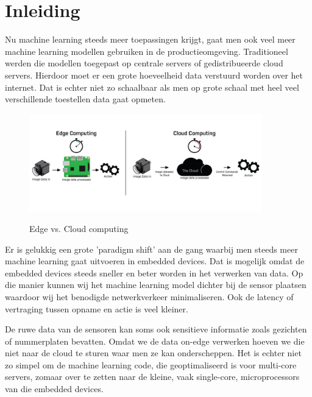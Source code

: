 \section{Inleiding}

Nu machine learning steeds meer toepassingen krijgt, gaat men ook veel meer machine learning modellen gebruiken in de productieomgeving.
Traditioneel werden die modellen toegepast op centrale servers of gedistribueerde cloud servers. Hierdoor moet er een grote hoeveelheid data verstuurd worden over het internet.
Dat is echter niet zo schaalbaar als men op grote schaal met heel veel verschillende toestellen data gaat opmeten. %

\begin{figure}[ht]
	\centering
	\includegraphics[width=0.9\textwidth]{figuren/iisedgecomputing.jpg}
	\caption{Edge vs. Cloud computing}
	\cite{flir-edge-computing}
	\label{fig:edge-vs-cloud}
\end{figure}

Er is gelukkig een grote 'paradigm shift' aan de gang waarbij men steeds meer machine learning gaat uitvoeren in embedded devices.
Dat is mogelijk omdat de embedded devices steeds sneller en beter worden in het verwerken van data.
Op die manier kunnen wij het machine learning model dichter bij de sensor plaatsen waardoor wij het benodigde netwerkverkeer minimaliseren.
Ook de latency of vertraging tussen opname en actie is veel kleiner. \cite{flir-edge-computing}

De ruwe data van de sensoren kan soms ook sensitieve informatie zoals gezichten of nummerplaten bevatten. Omdat we de data on-edge verwerken hoeven we die niet naar de cloud te sturen waar men ze kan onderscheppen. \cite{flir-edge-computing}
Het is echter niet zo simpel om de machine learning code, die geoptimaliseerd is voor multi-core servers, zomaar over te zetten naar de kleine, vaak single-core, microprocessors van die embedded devices.

